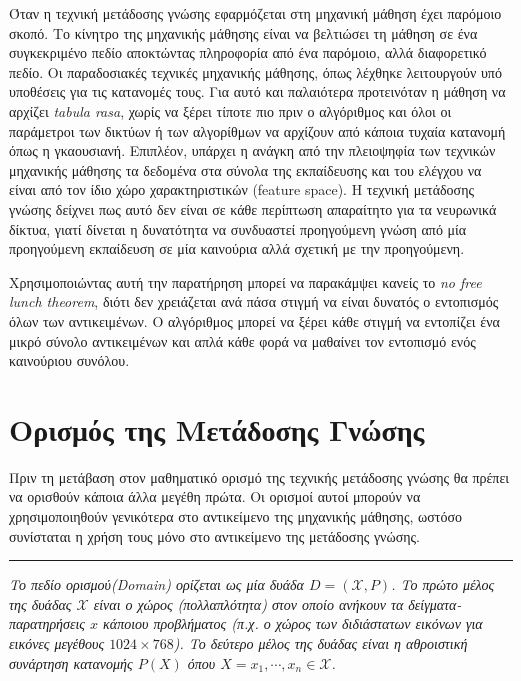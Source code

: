Όταν η τεχνική μετάδοσης γνώσης εφαρμόζεται στη μηχανική μάθηση έχει παρόμοιο σκοπό. Το κίνητρο της μηχανικής μάθησης είναι να βελτιώσει τη μάθηση σε ένα συγκεκριμένο πεδίο αποκτώντας πληροφορία από ένα παρόμοιο, αλλά διαφορετικό πεδίο. Οι παραδοσιακές τεχνικές μηχανικής μάθησης, όπως λέχθηκε λειτουργούν υπό υποθέσεις για τις κατανομές τους. Για αυτό και παλαιότερα προτεινόταν η μάθηση να αρχίζει \textit{tabula rasa}, χωρίς να ξέρει τίποτε πιο πριν ο αλγόριθμος και όλοι οι παράμετροι των δικτύων ή των αλγορίθμων να αρχίζουν από κάποια τυχαία κατανομή όπως η γκαουσιανή. Επιπλέον, υπάρχει η ανάγκη από την πλειοψηφία των τεχνικών μηχανικής μάθησης τα δεδομένα στα σύνολα της εκπαίδευσης και του ελέγχου να είναι από τον ίδιο χώρο χαρακτηριστικών (feature space).
Η τεχνική μετάδοσης γνώσης δείχνει πως αυτό δεν είναι σε κάθε περίπτωση απαραίτητο για τα νευρωνικά δίκτυα, γιατί δίνεται η δυνατότητα να συνδυαστεί προηγούμενη γνώση από μία προηγούμενη εκπαίδευση σε μία καινούρια αλλά σχετική με την προηγούμενη.

Χρησιμοποιώντας αυτή την παρατήρηση μπορεί να παρακάμψει κανείς το \textit{no free lunch theorem}, 
διότι δεν χρειάζεται ανά πάσα στιγμή να είναι δυνατός ο εντοπισμός όλων των αντικειμένων. Ο αλγόριθμος μπορεί  να ξέρει κάθε στιγμή να εντοπίζει ένα μικρό σύνολο αντικειμένων και απλά κάθε φορά να μαθαίνει τον εντοπισμό ενός καινούριου συνόλου.

\section{Ορισμός της Μετάδοσης Γνώσης \cite{40, 41}}
Πριν τη μετάβαση στον μαθηματικό ορισμό της τεχνικής μετάδοσης γνώσης θα πρέπει να ορισθούν κάποια άλλα μεγέθη
πρώτα. Οι ορισμοί αυτοί μπορούν να χρησιμοποιηθούν γενικότερα στο αντικείμενο της μηχανικής μάθησης, ωστόσο συνίσταται η χρήση τους μόνο στο αντικείμενο της μετάδοσης γνώσης.
\vspace{1ex}\\
{ \rule{1ex}{1ex} }%
\textit{Το πεδίο ορισμού(\textit{Domain}) ορίζεται ως μία δυάδα $D = (\mathcal{X},P)$. Το πρώτο μέλος της δυάδας $\mathcal{X}$ είναι ο χώρος (πολλαπλότητα) στον οποίο ανήκουν τα δείγματα-παρατηρήσεις $x$ κάποιου προβλήματος (π.χ. ο χώρος των διδιάστατων εικόνων για εικόνες μεγέθους $1024 \times 768$). Το δεύτερο μέλος της δυάδας είναι η αθροιστική συνάρτηση κατανομής $P(X)$ όπου $X = {x_1 , \cdots , x_n } \in \mathcal{X}$. }

